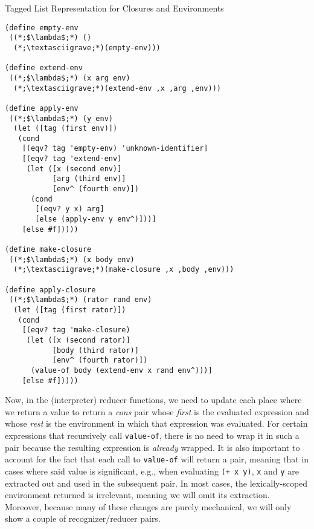 \begin{cl}[]{Tagged List Representation for Closures and Environments}
\begin{lstlisting}[language=MyScheme]
(define empty-env
 ((*;$\lambda$;*) ()
  (*;\textasciigrave;*)(empty-env)))

(define extend-env
 ((*;$\lambda$;*) (x arg env)
  (*;\textasciigrave;*)(extend-env ,x ,arg ,env)))

(define apply-env
 ((*;$\lambda$;*) (y env)
  (let ([tag (first env)])
   (cond
    [(eqv? tag 'empty-env) 'unknown-identifier]
    [(eqv? tag 'extend-env)
     (let ([x (second env)] 
           [arg (third env)] 
           [env^ (fourth env)])
      (cond
       [(eqv? y x) arg]
       [else (apply-env y env^)]))]
    [else #f]))))

(define make-closure
 ((*;$\lambda$;*) (x body env)
  (*;\textasciigrave;*)(make-closure ,x ,body ,env)))

(define apply-closure
 ((*;$\lambda$;*) (rator rand env)
  (let ([tag (first rator)])
   (cond
    [(eqv? tag 'make-closure)
     (let ([x (second rator)] 
           [body (third rator)] 
           [env^ (fourth rator)])
      (value-of body (extend-env x rand env^)))]
    [else #f]))))
\end{lstlisting}
\end{cl}

Now, in the (interpreter) reducer functions, we need to update each place where we return a value to return a \textit{cons} pair whose \textit{first} is the evaluated expression and whose \textit{rest} is the environment in which that expression was evaluated. For certain expressions that recursively call \texttt{value-of}, there is no need to wrap it in such a pair because the resulting expression is \textit{already} wrapped. It is also important to account for the fact that each call to \texttt{value-of} will return a pair, meaning that in cases where said value is significant, e.g., when evaluating \texttt{(+ x y)}, \texttt{x} and \texttt{y} are extracted out and used in the subsequent pair. In most cases, the lexically-scoped environment returned is irrelevant, meaning we will omit its extraction. Moreover, because many of these changes are purely mechanical, we will only show a couple of recognizer/reducer pairs.

